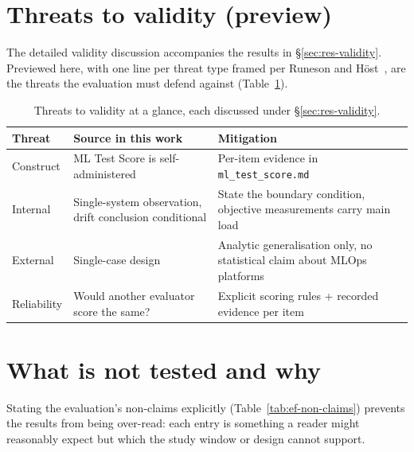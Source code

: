 \section{Threats to validity (preview)}
\label{sec:ef-validity}

The detailed validity discussion accompanies the results in
\S\ref{sec:res-validity}. Previewed here, with one line per threat type framed
per Runeson and H\"ost~\cite{runeson2009casestudy}, are the threats the
evaluation must defend against (Table~\ref{tab:ef-validity}).

\begin{table}[h]
  \centering
  \caption{Threats to validity at a glance, each discussed under \S\ref{sec:res-validity}.}
  \label{tab:ef-validity}
  \begin{tabularx}{\linewidth}{@{}l X X@{}}
    \toprule
    \textbf{Threat} & \textbf{Source in this work} & \textbf{Mitigation} \\
    \midrule
    Construct       & ML Test Score is self-administered & Per-item evidence in \texttt{ml\_test\_score.md} \\
    Internal        & Single-system observation, drift conclusion conditional & State the boundary condition, objective measurements carry main load \\
    External        & Single-case design & Analytic generalisation only, no statistical claim about MLOps platforms \\
    Reliability     & Would another evaluator score the same? & Explicit scoring rules + recorded evidence per item \\
    \bottomrule
  \end{tabularx}
\end{table}

\section{What is not tested and why}
\label{sec:ef-non-claims}

Stating the evaluation's non-claims explicitly (Table~\ref{tab:ef-non-claims})
prevents the results from being over-read: each entry is something a reader might
reasonably expect but which the study window or design cannot support.

